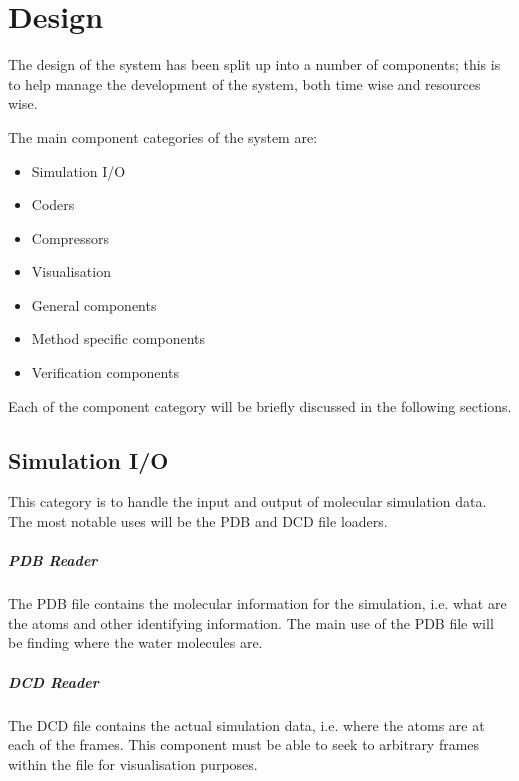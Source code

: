 \chapter{Design}
\label{chap:Design}

The design of the system has been split up into a number of components; this is
to help manage the development of the system, both time wise and resources
wise.

The main component categories of the system are:
\begin{itemize}
  \item Simulation I/O
  \item Coders
  \item Compressors
  \item Visualisation
  \item General components
  \item Method specific components
  \item Verification components
\end{itemize}

Each of the component category will be briefly discussed in the following sections.

\section{Simulation I/O}
\label{sec:simulationio}

This category is to handle the input and output of molecular simulation data.
The most notable uses will be the PDB and DCD file loaders.

\paragraph{PDB Reader}

The PDB file contains the molecular information for the simulation, i.e. what
are the atoms and other identifying information. The main use of the PDB file
will be finding where the water molecules are.


\paragraph{DCD Reader}

The DCD file contains the actual simulation data, i.e. where the atoms are at
each of the frames. This component must be able to seek to arbitrary frames
within the file for visualisation purposes.


